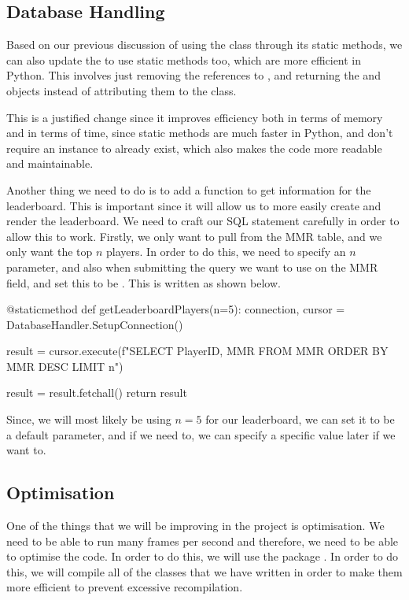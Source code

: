 \subsection{Database Handling}

Based on our previous discussion of using the  class through its static methods, we can also update the  to use static methods too, which are more efficient in Python. This involves just removing the references to , and returning the  and  objects instead of attributing them to the class.

\vs
This is a justified change since it improves efficiency both in terms of memory and in terms of time, since static methods are much faster in Python, and don't require an instance to already exist, which also makes the code more readable and maintainable.

\vs
Another thing we need to do is to add a function to get information for the leaderboard. This is important since it will allow us to more easily create and render the leaderboard. We need to craft our SQL statement carefully in order to allow this to work. Firstly, we only want to pull from the MMR table, and we only want the top $n$ players. In order to do this, we need to specify an $n$ parameter, and also when submitting the query we want to use  on the MMR field, and set this to be . This is written as shown below.

\begin{mpy}
    @staticmethod
    def getLeaderboardPlayers(n=5):
        connection, cursor = DatabaseHandler.SetupConnection()

        result = cursor.execute(f"SELECT PlayerID, MMR FROM MMR ORDER BY MMR DESC LIMIT {n}")

        result = result.fetchall()
        return result
\end{mpy}

Since, we will most likely be using $n=5$ for our leaderboard, we can set it to be a default parameter, and if we need to, we can specify a specific value later if we want to.

\subsection{Optimisation}

One of the things that we will be improving in the project is optimisation. We need to be able to run many frames per second and therefore, we need to be able to optimise the code. In order to do this, we will use the package . In order to do this, we will compile all of the classes that we have written in order to make them more efficient to prevent excessive recompilation.
\vs

